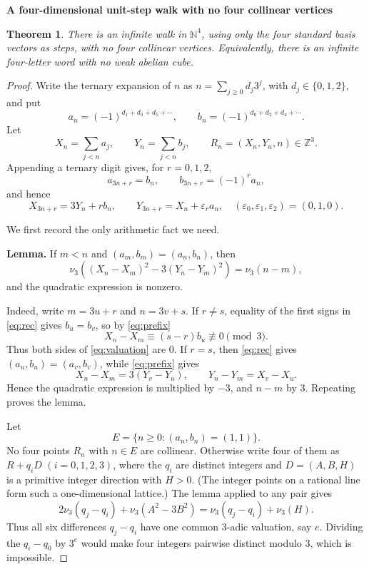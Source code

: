 \documentclass[11pt]{article}
\newtheorem*{theorem}{Theorem}
\newcommand{\N}{\mathbb N}
\newcommand{\vthree}{\nu_3}
\begin{document}
\begin{center}
{\Large\bfseries A four-dimensional unit-step walk with no four collinear vertices}
\end{center}

\begin{theorem}
There is an infinite walk in $\N^4$, using only the four standard basis
vectors as steps, with no four collinear vertices. Equivalently, there is
an infinite four-letter word with no weak abelian cube.
\end{theorem}

\begin{proof}
Write the ternary expansion of $n$ as $n=\sum_{j\ge0}d_j3^j$, with
$d_j\in\{0,1,2\}$, and put
\[
 a_n=(-1)^{d_1+d_3+d_5+\cdots},\qquad
 b_n=(-1)^{d_0+d_2+d_4+\cdots}.
\]
Let
\[
 X_n=\sum_{j<n}a_j,\qquad Y_n=\sum_{j<n}b_j,
 \qquad R_n=(X_n,Y_n,n)\in\mathbb Z^3.
\]
Appending a ternary digit gives, for $r=0,1,2$,
\begin{equation}\label{eq:rec}
 a_{3n+r}=b_n,\qquad b_{3n+r}=(-1)^r a_n,
\end{equation}
and hence
\begin{equation}\label{eq:prefix}
 X_{3n+r}=3Y_n+r b_n,\qquad
 Y_{3n+r}=X_n+\varepsilon_r a_n,
 \quad (\varepsilon_0,\varepsilon_1,\varepsilon_2)=(0,1,0).
\end{equation}

We first record the only arithmetic fact we need.

\medskip
\noindent\textbf{Lemma.}
If $m<n$ and $(a_m,b_m)=(a_n,b_n)$, then
\begin{equation}\label{eq:valuation}
 \vthree\!\left((X_n-X_m)^2-3(Y_n-Y_m)^2\right)=\vthree(n-m),
\end{equation}
and the quadratic expression is nonzero.

\smallskip
Indeed, write $m=3u+r$ and $n=3v+s$. If $r\ne s$, equality of the
first signs in \eqref{eq:rec} gives $b_u=b_v$, so by \eqref{eq:prefix}
\[
 X_n-X_m\equiv(s-r)b_u\not\equiv0\pmod3.
\]
Thus both sides of \eqref{eq:valuation} are $0$. If $r=s$, then
\eqref{eq:rec} gives $(a_u,b_u)=(a_v,b_v)$, while \eqref{eq:prefix}
gives
\[
 X_n-X_m=3(Y_v-Y_u),\qquad Y_n-Y_m=X_v-X_u.
\]
Hence the quadratic expression is multiplied by $-3$, and $n-m$ by
$3$. Repeating proves the lemma.

Let
\[
 E=\{n\ge0:(a_n,b_n)=(1,1)\}.
\]
No four points $R_n$ with $n\in E$ are collinear. Otherwise write four
of them as $R+q_iD$ $(i=0,1,2,3)$, where the $q_i$ are distinct integers
and $D=(A,B,H)$ is a primitive integer direction with $H>0$. (The integer
points on a rational line form such a one-dimensional lattice.) The lemma
applied to any pair gives
\[
 2\vthree(q_j-q_i)+\vthree(A^2-3B^2)
 =\vthree(q_j-q_i)+\vthree(H).
\]
Thus all six differences $q_j-q_i$ have one common $3$-adic valuation,
say $e$. Dividing the $q_i-q_0$ by $3^e$ would make four integers pairwise
distinct modulo $3$, which is impossible.


\end{proof}
\end{document}
